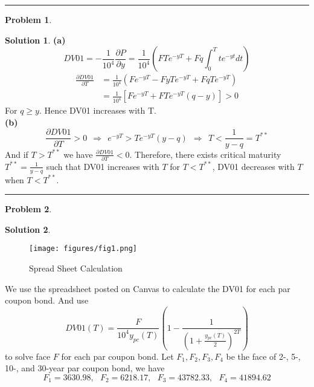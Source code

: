 \documentclass[a4paper, 10pt]{article}
\theoremstyle{definition}
\newtheorem{problem}{Problem}
\theoremstyle{hSol}
\newtheorem*{solution}{Solution}
\begin{document}
\noindent\rule{16cm}{0.4pt}
\begin{problem}
\end{problem}
\begin{solution} \textbf{(a)} 
$$
DV01= -\frac{1}{10^4}\frac{\partial P}{\partial y} = \frac{1}{10^4}\left(FTe^{-yT} + Fq\int_0^T te^{-yt}dt\right)
$$
\begin{equation}
  \begin{split}
    \frac{\partial DV01}{\partial T} &= \frac{1}{10^4}\left(Fe^{-yT} -FyTe^{-yT} + Fq Te^{-yT}\right) \\
    &=\frac{1}{10^4}\left[Fe^{-yT} +FTe^{-yT}(q-y)\right] >0
  \end{split}
\end{equation}
For $q\geq y$. Hence DV01 increases with T.\\
\textbf{(b)} 
$$
\frac{\partial DV01}{\partial T}> 0~~\Rightarrow~~e^{-yT}  >Te^{-yT}(y-q)~~\Rightarrow~~T<\frac{1}{y-q} = T^{**}
$$
And if $T>T^{**}$ we have $\frac{\partial DV01}{\partial T}<0$. Therefore, there exists critical maturity $T^{**}=\frac{1}{y-q}$ such that DV01 increases with $T$ for $T<T^{**}$, DV01 decreases with $T$ when $T<T^{**}$.

\end{solution}

\noindent\rule{16cm}{0.4pt}
\begin{problem}
\end{problem}
\begin{solution}

\begin{figure}[H]
  \centering
  \captionsetup{justification=centering}
  \caption{\label{fig:span}Spread Sheet Calculation}
  \vspace{-10pt}
  \texttt{[image: figures/fig1.png]}
\end{figure}
We use the spreadsheet posted on Canvas to calculate the DV01 for each par coupon bond. And use
$$
DV01(T) = \frac{F}{10^4 y_{pc}(T)} \left(1-\frac{1}{(1+\frac{y_{pc}(T)}{2})^{2T}}\right)
$$
to solve face $F$ for each par coupon bond. Let $F_1, F_2, F_3, F_4$ be the face of 2-, 5-, 10-, and 30-year par coupon bond, we have
$$
F_1 = 3630.98,~~~F_2=6218.17,~~~F_3= 43782.33,~~~F_4=41894.62
$$
\end{solution}
\end{document}
